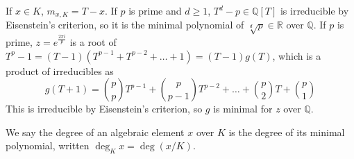 \begin{example}
	If \( x \in K \), \( m_{x,K} = T - x \).
	If \( p \) is prime and \( d \geq 1 \), \( T^d - p \in \mathbb Q[T] \) is irreducible by Eisenstein's criterion, so it is the minimal polynomial of \( \sqrt[d]{p} \in \mathbb R \) over \( \mathbb Q \).
	If \( p \) is prime, \( z = e^{\frac{2\pi i}{p}} \) is a root of \( T^p - 1 = (T-1)(T^{p-1} + T^{p-2} + \dots + 1) = (T-1)g(T) \), which is a product of irreducibles as
	\[ g(T+1) = \binom p p T^{p-1} + \binom p {p-1} T^{p-2} + \dots + \binom p 2 T + \binom p 1 \]
	This is irreducible by Eisenstein's criterion, so \( g \) is minimal for \( z \) over \( \mathbb Q \).
\end{example}

We say the degree of an algebraic element \( x \) over \( K \) is the degree of its minimal polynomial, written \( \deg_K x = \deg(x/K) \).

